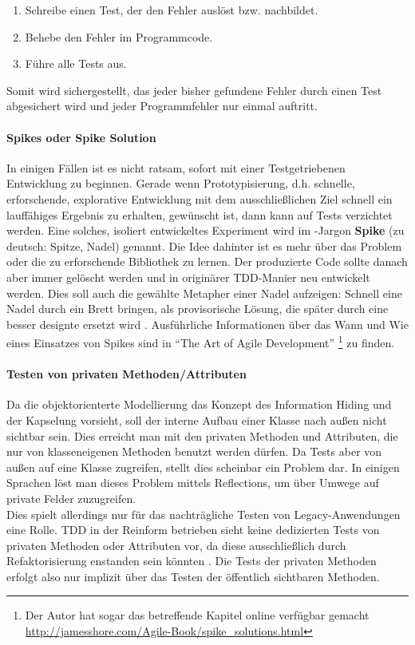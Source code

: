   \begin{enumerate}
   \item Schreibe einen Test, der den Fehler auslöst bzw. nachbildet.
   \item Behebe den Fehler im Programmcode.
   \item Führe alle Tests aus.
  \end{enumerate}
  Somit wird sichergestellt, das jeder bisher gefundene Fehler durch einen Test abgesichert wird und jeder Programmfehler nur einmal auftritt.
  \paragraph{Spikes oder Spike Solution} In einigen Fällen ist es nicht ratsam, sofort mit einer Testgetriebenen Entwicklung zu beginnen. Gerade wenn Prototypisierung, d.h. schnelle, erforschende, explorative Entwicklung mit dem ausschließlichen Ziel schnell ein lauffähiges Ergebnis zu erhalten, gewünscht ist, dann kann auf Tests verzichtet werden. Eine solches, isoliert entwickeltes Experiment wird im -Jargon \textbf{Spike} (zu deutsch: Spitze, Nadel) genannt. Die Idee dahinter ist es mehr über das Problem oder die zu erforschende Bibliothek zu lernen. Der produzierte Code sollte danach aber immer gelöscht werden und in originärer TDD-Manier neu entwickelt werden. Dies soll auch die gewählte Metapher einer Nadel aufzeigen: Schnell eine Nadel durch ein Brett bringen, als provisorische Lösung, die später durch eine besser designte ersetzt wird \citep{shore_art_2007}. Ausführliche Informationen über das Wann und Wie eines Einsatzes von Spikes sind in "`The Art of Agile Development"' \citep{shore_art_2007}\footnote{Der Autor hat sogar das betreffende Kapitel online verfügbar gemacht \url{http://jamesshore.com/Agile-Book/spike_solutions.html}} zu finden.

  \paragraph{Testen von privaten Methoden/Attributen} Da die objektorienterte Modellierung das Konzept des Information Hiding und der Kapselung vorsieht, soll der interne Aufbau einer Klasse nach außen nicht sichtbar sein. Dies erreicht man mit den privaten Methoden und Attributen, die nur von klasseneigenen Methoden benutzt werden dürfen. Da Tests aber von außen auf eine Klasse zugreifen, stellt dies scheinbar ein Problem dar. In einigen Sprachen löst man dieses Problem mittels Reflections, um über Umwege auf private Felder zuzugreifen. \\
  Dies spielt allerdings nur für das nachträgliche Testen von Legacy-Anwendungen eine Rolle. TDD in der Reinform betrieben sieht keine dedizierten Tests von privaten Methoden oder Attributen vor, da diese ausschließlich durch Refaktorisierung enstanden sein könnten \citep{caroli_agile_2008}. Die Tests der privaten Methoden erfolgt also nur implizit über das Testen der öffentlich sichtbaren Methoden.



